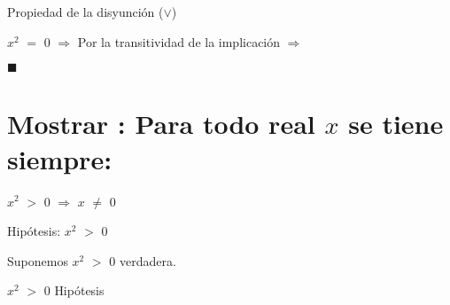 \documentclass[12pt]{article}
\renewcommand{\qedsymbol}{$\blacksquare$}
\begin{document}
 \hspace{0.2cm} \hspace{4.5cm} {\textcolor{carrotorange}{Propiedad de la disyunción  ({\LARGE{${\vee}$}})}} \vspace{0.5cm}

$x^{2}$ $=$ $0$ \hspace{0.2cm} $\Longrightarrow$ \hspace{0.2cm}  \hspace{1.6cm} {\textcolor{carrotorange}{Por la transitividad de la implicación}} {\textcolor{vividviolet}{{\bf{$\Longrightarrow$}}}} \vspace{0.5cm}

\hspace{6.6cm} \textcolor{carrotorange}{\qedsymbol}

\newpage


\section{\textsf{Mostrar {} {}: Para todo real $x$ se tiene siempre:}} \vspace{.5cm}

{\LARGE{{} \hspace{.1cm} $x^{2}$ $>$ $0$ $\Longrightarrow$ $x$ $\neq$ $0$}} \vspace{.5cm}

{}  \vspace{0.5cm}

{} \vspace{0.5cm} 

{\textcolor{palatinateblue}{Hipótesis:} {\Large{$x^{2}$ $>$ $0$}}} \vspace{0.5cm}

{\textcolor{palatinateblue}{Suponemos}} {\Large{$x^{2}$ $>$ $0$}} {\textcolor{pakistangreen}{verdadera.}} \vspace{0.5cm}

$x^{2}$ $>$ $0$ \hspace{8.2cm} {\textcolor{palatinateblue}{Hipótesis}} \vspace{0.5cm}
\end{document}
